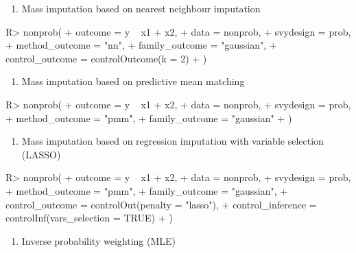 \documentclass[
]{jss}
\providecommand{\tightlist}{%
  \setlength{\itemsep}{0pt}\setlength{\parskip}{0pt}}
\begin{document}
\begin{enumerate}
\def\labelenumi{\arabic{enumi}.}
\setcounter{enumi}{1}
\tightlist
\item
  Mass imputation based on nearest neighbour imputation
\end{enumerate}

\begin{CodeChunk}
\begin{CodeInput}
R> nonprob(
+   outcome = y ~ x1 + x2, 
+   data = nonprob, 
+   svydesign = prob, 
+   method_outcome = "nn", 
+   family_outcome = "gaussian", 
+   control_outcome = controlOutcome(k = 2)
+ )
\end{CodeInput}
\end{CodeChunk}

\begin{enumerate}
\def\labelenumi{\arabic{enumi}.}
\setcounter{enumi}{2}
\tightlist
\item
  Mass imputation based on predictive mean matching
\end{enumerate}

\begin{CodeChunk}
\begin{CodeInput}
R> nonprob(
+   outcome = y ~ x1 + x2, 
+   data = nonprob, 
+   svydesign = prob, 
+   method_outcome = "pmm", 
+   family_outcome = "gaussian"
+ )
\end{CodeInput}
\end{CodeChunk}

\begin{enumerate}
\def\labelenumi{\arabic{enumi}.}
\setcounter{enumi}{3}
\tightlist
\item
  Mass imputation based on regression imputation with variable selection
  (LASSO)
\end{enumerate}

\begin{CodeChunk}
\begin{CodeInput}
R> nonprob(
+   outcome = y ~ x1 + x2, 
+   data = nonprob, 
+   svydesign = prob, 
+   method_outcome = "pmm", 
+   family_outcome = "gaussian", 
+   control_outcome = controlOut(penalty = "lasso"), 
+   control_inference = controlInf(vars_selection = TRUE)
+ )
\end{CodeInput}
\end{CodeChunk}

\begin{enumerate}
\def\labelenumi{\arabic{enumi}.}
\setcounter{enumi}{4}
\tightlist
\item
  Inverse probability weighting (MLE)
\end{enumerate}
\end{document}
